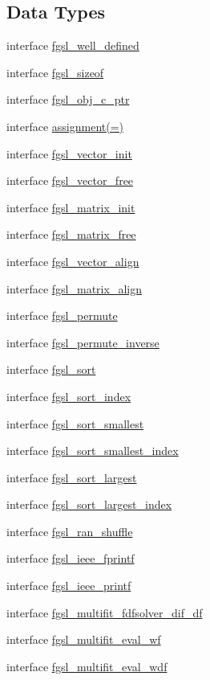 \subsection*{Data Types}
\begin{DoxyCompactItemize}
\item 
interface \hyperlink{interfacefgsl__well__defined}{fgsl\+\_\+well\+\_\+defined}
\item 
interface \hyperlink{interfacefgsl__sizeof}{fgsl\+\_\+sizeof}
\item 
interface \hyperlink{interfacefgsl__obj__c__ptr}{fgsl\+\_\+obj\+\_\+c\+\_\+ptr}
\item 
interface \hyperlink{interfaceassignment_07_0A_08}{assignment(=)}
\item 
interface \hyperlink{interfacefgsl__vector__init}{fgsl\+\_\+vector\+\_\+init}
\item 
interface \hyperlink{interfacefgsl__vector__free}{fgsl\+\_\+vector\+\_\+free}
\item 
interface \hyperlink{interfacefgsl__matrix__init}{fgsl\+\_\+matrix\+\_\+init}
\item 
interface \hyperlink{interfacefgsl__matrix__free}{fgsl\+\_\+matrix\+\_\+free}
\item 
interface \hyperlink{interfacefgsl__vector__align}{fgsl\+\_\+vector\+\_\+align}
\item 
interface \hyperlink{interfacefgsl__matrix__align}{fgsl\+\_\+matrix\+\_\+align}
\item 
interface \hyperlink{interfacefgsl__permute}{fgsl\+\_\+permute}
\item 
interface \hyperlink{interfacefgsl__permute__inverse}{fgsl\+\_\+permute\+\_\+inverse}
\item 
interface \hyperlink{interfacefgsl__sort}{fgsl\+\_\+sort}
\item 
interface \hyperlink{interfacefgsl__sort__index}{fgsl\+\_\+sort\+\_\+index}
\item 
interface \hyperlink{interfacefgsl__sort__smallest}{fgsl\+\_\+sort\+\_\+smallest}
\item 
interface \hyperlink{interfacefgsl__sort__smallest__index}{fgsl\+\_\+sort\+\_\+smallest\+\_\+index}
\item 
interface \hyperlink{interfacefgsl__sort__largest}{fgsl\+\_\+sort\+\_\+largest}
\item 
interface \hyperlink{interfacefgsl__sort__largest__index}{fgsl\+\_\+sort\+\_\+largest\+\_\+index}
\item 
interface \hyperlink{interfacefgsl__ran__shuffle}{fgsl\+\_\+ran\+\_\+shuffle}
\item 
interface \hyperlink{interfacefgsl__ieee__fprintf}{fgsl\+\_\+ieee\+\_\+fprintf}
\item 
interface \hyperlink{interfacefgsl__ieee__printf}{fgsl\+\_\+ieee\+\_\+printf}
\item 
interface \hyperlink{interfacefgsl__multifit__fdfsolver__dif__df}{fgsl\+\_\+multifit\+\_\+fdfsolver\+\_\+dif\+\_\+df}
\item 
interface \hyperlink{interfacefgsl__multifit__eval__wf}{fgsl\+\_\+multifit\+\_\+eval\+\_\+wf}
\item 
interface \hyperlink{interfacefgsl__multifit__eval__wdf}{fgsl\+\_\+multifit\+\_\+eval\+\_\+wdf}
\end{DoxyCompactItemize}
